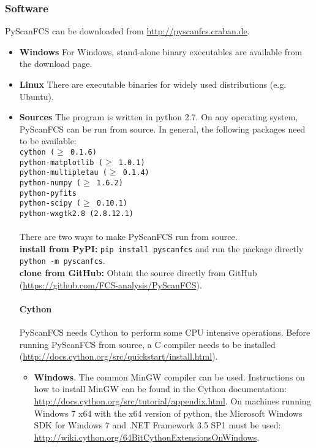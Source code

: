 \subsubsection*{Software}
PyScanFCS can be downloaded from \url{http://pyscanfcs.craban.de}.
\begin{itemize}
\item \textbf{Windows}
For Windows, stand-alone binary executables are available from the download page. 
\item \textbf{Linux}
There are executable binaries for widely used distributions (e.g. Ubuntu).
\item \textbf{Sources}
The program is written in python 2.7. On any operating system, PyScanFCS can be run from source. In general, the following packages need to be available:
\texttt{\\
cython ($\geq$ 0.1.6)\\
python-matplotlib ($\geq$ 1.0.1) \\
python-multipletau ($\geq$ 0.1.4) \\
python-numpy ($\geq$ 1.6.2) \\
python-pyfits \\
python-scipy ($\geq$ 0.10.1) \\
python-wxgtk2.8 (2.8.12.1) \\
}
\\
There are two ways to make PyScanFCS run from source.\\
\textbf{install from PyPI:}
\texttt{pip install pyscanfcs}
and run the package directly
\texttt{python -m pyscanfcs}.
\\
\textbf{clone from GitHub:}
Obtain the source directly from GitHub (\url{https://github.com/FCS-analysis/PyScanFCS}).


\paragraph*{Cython}
PyScanFCS needs Cython to perform some CPU intensive operations. Before running PyScanFCS from source, a C compiler needs to be installed (\url{http://docs.cython.org/src/quickstart/install.html}).
\begin{itemize}
\item[ ] \textbf{Windows}. The common MinGW compiler can be used. Instructions on how to install MinGW can be found in the Cython documentation: \url{http://docs.cython.org/src/tutorial/appendix.html}. On machines running Windows 7 x64 with the x64 version of python, the Microsoft Windows SDK for Windows 7 and .NET Framework 3.5 SP1 must be used: \\
\url{http://wiki.cython.org/64BitCythonExtensionsOnWindows}.


\end{itemize}
\end{itemize}
